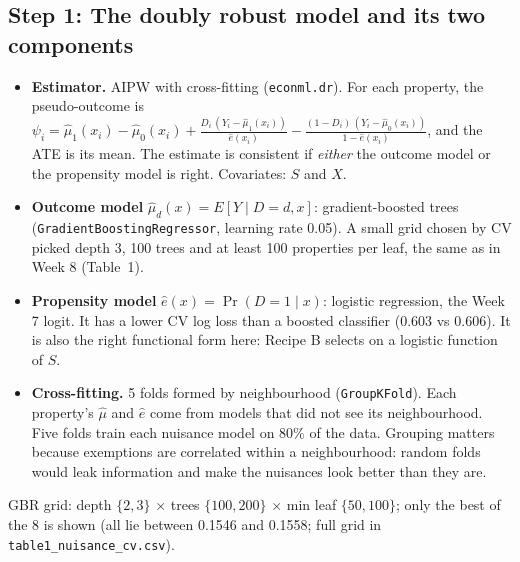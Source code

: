 \documentclass[11pt]{article}
\begin{document}
\subsection{Step 1: The doubly robust model and its two components}
\begin{itemize}
\item \textbf{Estimator.} AIPW with cross-fitting (\texttt{econml.dr}). For each property, the pseudo-outcome is
$\psi_i=\hat\mu_1(x_i)-\hat\mu_0(x_i)+\frac{D_i\,(Y_i-\hat\mu_1(x_i))}{\hat e(x_i)}-\frac{(1-D_i)\,(Y_i-\hat\mu_0(x_i))}{1-\hat e(x_i)}$, and the ATE is its mean. The estimate is consistent if \emph{either} the outcome model or the propensity model is right. Covariates: $S$ and $X$.
\item \textbf{Outcome model} $\hat\mu_d(x)=E[Y\mid D=d,x]$: gradient-boosted trees (\texttt{GradientBoostingRegressor}, learning rate 0.05). A small grid chosen by CV picked depth 3, 100 trees and at least 100 properties per leaf, the same as in Week 8 (Table~1).
\item \textbf{Propensity model} $\hat e(x)=\Pr(D=1\mid x)$: logistic regression, the Week 7 logit. It has a lower CV log loss than a boosted classifier (0.603 vs 0.606). It is also the right functional form here: Recipe B selects on a logistic function of $S$.
\item \textbf{Cross-fitting.} 5 folds formed by neighbourhood (\texttt{GroupKFold}). Each property's $\hat\mu$ and $\hat e$ come from models that did not see its neighbourhood. Five folds train each nuisance model on 80\% of the data. Grouping matters because exemptions are correlated within a neighbourhood: random folds would leak information and make the nuisances look better than they are.
\end{itemize}
\begin{table}[H]\centering\small
\caption{Choosing the nuisance models: 5-fold CV by neighbourhood, biased sample, covariates $S$ and $X$.}

\par\smallskip\footnotesize GBR grid: depth $\{2,3\}$ $\times$ trees $\{100,200\}$ $\times$ min leaf $\{50,100\}$; only the best of the 8 is shown (all lie between 0.1546 and 0.1558; full grid in \texttt{table1\_nuisance\_cv.csv}).
\end{table}
\end{document}
